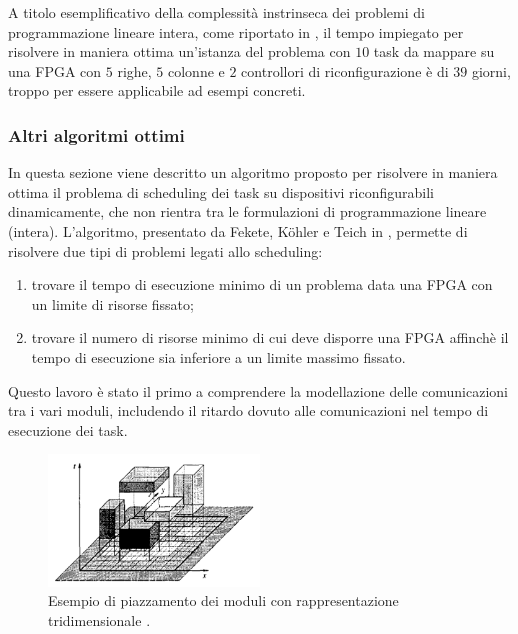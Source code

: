 A titolo esemplificativo della complessità instrinseca dei problemi di programmazione
lineare intera, come riportato in \cite{Redaelli2DILP}, il tempo impiegato per risolvere in 
maniera ottima un'istanza del problema con $10$ task da mappare su una 
\ac{FPGA} con $5$ righe, $5$ colonne e $2$ controllori di riconfigurazione è di 
$39$ giorni, troppo per essere applicabile ad esempi concreti.


\subsubsection{Altri algoritmi ottimi}
In questa sezione viene descritto un algoritmo proposto per risolvere in 
maniera ottima il problema di scheduling dei task su dispositivi 
riconfigurabili dinamicamente, che non rientra tra le formulazioni di 
programmazione lineare (intera). L'algoritmo, presentato da Fekete, K\"ohler 
e Teich in \cite{FeketeOptimal}, permette di risolvere due tipi di problemi 
legati allo scheduling:
\begin{enumerate}
 \item trovare il tempo di esecuzione minimo di un problema data una \ac{FPGA} 
con un limite di risorse fissato;
 \item trovare il numero di risorse minimo di cui deve disporre una \ac{FPGA} 
affinchè il tempo di esecuzione sia inferiore a un limite massimo fissato.
\end{enumerate}

Questo lavoro è stato il primo a comprendere la modellazione delle 
comunicazioni tra i vari moduli, includendo il ritardo dovuto alle 
comunicazioni nel tempo di esecuzione dei task.

\begin{figure}[!tb]
 \begin{center}
  \includegraphics[width=0.5\textwidth]
{capitoli/figure/cap3/BoxModules.pdf}
\caption[Piazzamento dei moduli con rappresentazione tridimensionale]{Esempio 
di piazzamento dei moduli con rappresentazione tridimensionale \cite{FeketeOptimal}.}
\label{fig:boxModules}
 \end{center}
\end{figure}


